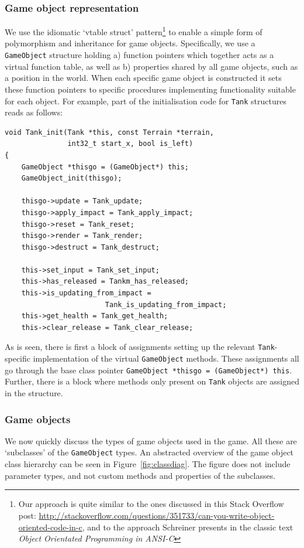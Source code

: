 \documentclass[a4paper,10pt]{article}
\newcommand{\isrc}[1]{\texttt{#1}}
\begin{document}
\subsubsection{Game object representation}
We use the idiomatic `vtable struct' pattern\footnote{Our approach is quite
similar to the ones discussed in this Stack Overflow post:
\url{http://stackoverflow.com/questions/351733/can-you-write-object-oriented-code-in-c},
and to the approach Schreiner presents in the classic text \emph{Object
Orientated Programming in ANSI-C}} to enable a simple form of polymorphism and
inheritance for game objects. Specifically, we use a \isrc{GameObject}
structure holding a) function pointers which together acts as a virtual
function table, as well as b) properties shared by all game objects, such as a
position in the world.  When each specific game object is constructed it sets
these function pointers to specific procedures implementing functionality
suitable for each object. For example, part of the initialisation code for
\isrc{Tank} structures reads as follows:
\begin{lstlisting}
void Tank_init(Tank *this, const Terrain *terrain, 
               int32_t start_x, bool is_left)
{
    GameObject *thisgo = (GameObject*) this;
    GameObject_init(thisgo);

    thisgo->update = Tank_update;
    thisgo->apply_impact = Tank_apply_impact;
    thisgo->reset = Tank_reset;
    thisgo->render = Tank_render;
    thisgo->destruct = Tank_destruct;

    this->set_input = Tank_set_input;
    this->has_released = Tankm_has_released;
    this->is_updating_from_impact = 
                        Tank_is_updating_from_impact;
    this->get_health = Tank_get_health;
    this->clear_release = Tank_clear_release;
\end{lstlisting}
As is seen, there is first a block of assignments setting up the relevant
\isrc{Tank}-specific implementation of the virtual \isrc{GameObject} methods.
These assignments all go through the base class pointer \isrc{GameObject
*thisgo = (GameObject*) this}. Further, there is a block where methods only
present on \isrc{Tank} objects are assigned in the structure.

\subsubsection{Game objects}
We now quickly discuss the types of game objects used in the game. All these
are `subclasses' of the \isrc{GameObject} types. An abstracted overview of the
game object class hierarchy can be seen in Figure~\ref{fig:classdiag}. The
figure does not include parameter types, and not custom methods and properties
of the subclasses.
\end{document}
